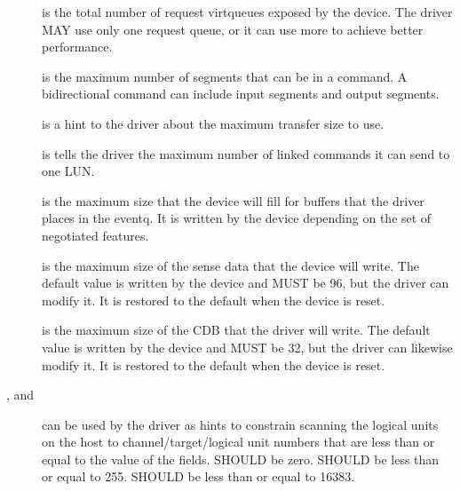 \begin{description}
\item[] is the total number of request virtqueues exposed by
    the device. The driver MAY use only one request queue,
    or it can use more to achieve better performance.

\item[] is the maximum number of segments that can be in a
    command. A bidirectional command can include  input
    segments and  output segments.

\item[] is a hint to the driver about the maximum transfer
    size to use.

\item[] is tells the driver the maximum number of
    linked commands it can send to one LUN.

\item[] is the maximum size that the device will fill
    for buffers that the driver places in the eventq. It is
    written by the device depending on the set of negotiated
    features.

\item[] is the maximum size of the sense data that the
    device will write. The default value is written by the device
    and MUST be 96, but the driver can modify it. It is
    restored to the default when the device is reset.

\item[] is the maximum size of the CDB that the driver will
    write. The default value is written by the device and MUST
    be 32, but the driver can likewise modify it. It is
    restored to the default when the device is reset.

\item[,  and ] can be
    used by the driver as hints to constrain scanning the logical units
    on the host to channel/target/logical unit numbers that are less than
    or equal to the value of the fields.   SHOULD
    be zero.   SHOULD be less than or equal to 255.
     SHOULD be less than or equal to 16383.
\end{description}



